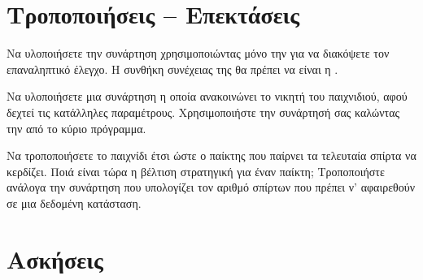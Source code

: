 \documentclass[a4paper,11pt,oneside]{book}
\begin{document}
\tobecontinued

\tobecontinued



\section{Τροποποιήσεις -- Επεκτάσεις}

\begin{exercise}
Να υλοποιήσετε την συνάρτηση  χρησιμοποιώντας μόνο την  για να διακόψετε τον επαναληπτικό έλεγχο. Η συνθήκη συνέχειας της  θα πρέπει να είναι η .
\end{exercise}

\begin{exercise}
Να υλοποιήσετε μια συνάρτηση η οποία ανακοινώνει το νικητή του παιχνιδιού, αφού δεχτεί τις κατάλληλες παραμέτρους. Χρησιμοποιήστε την συνάρτησή σας καλώντας την από το κύριο πρόγραμμα.
\end{exercise}

\begin{exercise}
Να τροποποιήσετε το παιχνίδι έτσι ώστε ο παίκτης που παίρνει τα τελευταία σπίρτα να κερδίζει. Ποιά είναι τώρα η βέλτιση στρατηγική για έναν παίκτη; Τροποποιήστε ανάλογα την συνάρτηση  που υπολογίζει τον αριθμό σπίρτων που πρέπει ν' αφαιρεθούν σε μια δεδομένη κατάσταση.
\end{exercise}



\section{Ασκήσεις}
\end{document}
